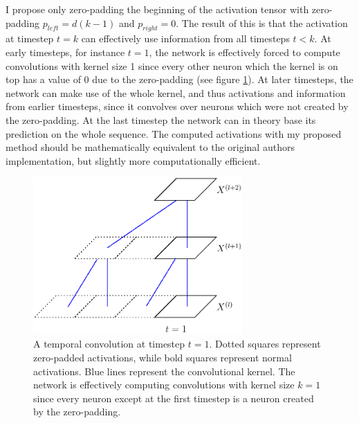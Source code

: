 \documentclass[a4paper, twoside]{article}
\begin{document}
I propose only zero-padding the beginning of the activation tensor with zero-padding $p_{left} = d(k-1)$ and $p_{right} = 0$. The result of this is that the activation at timestep $t=k$ can effectively use information from all timesteps $t<k$. At early timesteps, for instance $t=1$, the network is effectively forced to compute convolutions with kernel size 1 since every other neuron which the kernel is on top has a value of 0 due to the zero-padding (see figure \ref{figTCNZeropad}). At later timesteps, the network can make use of the whole kernel, and thus activations and information from earlier timesteps, since it convolves over neurons which were not created by the zero-padding. At the last timestep the network can in theory base its prediction on the whole sequence. The computed activations with my proposed method should be mathematically equivalent to the original authors implementation, but slightly more computationally efficient.


\begin{figure}[h]
\begin{center}
    \includegraphics[width=8cm]{figTCNZeropad.eps}\caption{A temporal convolution at timestep $t=1$. Dotted squares represent zero-padded activations, while bold squares represent normal activations. Blue lines represent the convolutional kernel. The network is effectively computing convolutions with kernel size $k=1$ since every neuron except at the first timestep is a neuron created by the zero-padding.}\label{figTCNZeropad}
\end{center}
\end{figure}
\end{document}
